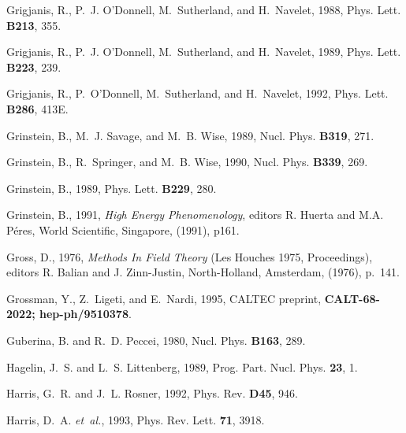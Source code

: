 \begin{thebibliography}{\protect{}1991}
Grigjanis, R., P.~J. O'Donnell, M.~Sutherland, and H.~Navelet, 1988,
\newblock Phys. Lett. {\bf B213}, 355.

Grigjanis, R., P.~J. {O'Donnell}, M.~Sutherland, and H.~Navelet, 1989,
\newblock Phys. Lett. {\bf B223}, 239.

Grigjanis, R., P.~{O'Donnell}, M.~Sutherland, and H.~Navelet, 1992,
\newblock Phys. Lett. {\bf B286}, 413E.

Grinstein, B., M.~J. Savage, and M.~B. Wise, 1989,
\newblock Nucl. Phys. {\bf B319}, 271.

Grinstein, B., R.~Springer, and M.~B. Wise, 1990,
\newblock Nucl. Phys. {\bf B339}, 269.

Grinstein, B., 1989,
\newblock Phys. Lett. {\bf B229}, 280.

Grinstein, B., 1991,
 {\em High Energy Phenomenology}, {\rm editors R. Huerta and
  M.A. P\'{e}res, World Scientific, Singapore, (1991), p\. 161}.

Gross, D., 1976,
 {\em Methods In Field Theory} {\rm (Les Houches 1975,
  Proceedings), editors R. Balian and J. Zinn-Justin, North-Holland, Amsterdam,
  (1976), p.\ 141}.

Grossman, Y., Z.~Ligeti, and E.~Nardi, 1995,
\newblock CALTEC preprint, {\bf CALT-68-2022; hep-ph/9510378}.

Guberina, B. and R.~D. Peccei, 1980,
\newblock Nucl. Phys. {\bf B163}, 289.

Hagelin, J.~S. and L.~S. Littenberg, 1989,
\newblock Prog. Part. Nucl. Phys. {\bf 23}, 1.

Harris, G.~R. and J.~L. Rosner, 1992,
\newblock Phys. Rev. {\bf D45}, 946.

Harris, D.~A. {\em et~al.\/}, 1993,
\newblock Phys. Rev. Lett. {\bf 71}, 3918.


\end{thebibliography}
